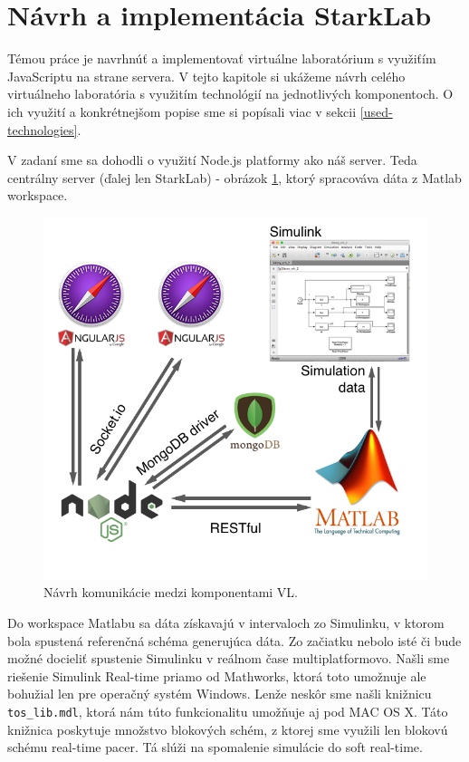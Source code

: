 \section{Návrh a implementácia StarkLab}
\indent Témou práce je navrhnúť a implementovať virtuálne laboratórium s využiťím JavaScriptu na strane servera. V tejto kapitole si ukážeme návrh celého virtuálneho laboratória s využitím technológií na jednotlivých komponentoch. O ich využití a konkrétnejšom popise sme si popísali viac v sekcii \ref{used-technologies}.

V zadaní sme sa dohodli o využití Node.js platformy ako náš server. Teda centrálny server (ďalej len StarkLab) - obrázok \ref{img-software-design}, ktorý spracováva dáta z Matlab workspace. 

\begin{figure}[H]
  \centering
  \includegraphics[scale=0.55]{img/StarkLab.png}
  \caption{Návrh komunikácie medzi komponentami VL.}
  \label{img-software-design}
\end{figure}

Do workspace Matlabu sa dáta získavajú v intervaloch zo Simulinku, v ktorom bola spustená referenčná schéma generujúca dáta. Zo začiatku nebolo isté či bude možné docieliť spustenie Simulinku v reálnom čase multiplatformovo. Našli sme riešenie Simulink Real-time priamo od Mathworks, ktorá toto umožnuje ale bohužial len pre operačný systém Windows. Lenže neskôr sme našli knižnicu \verb|tos_lib.mdl|, ktorá nám túto funkcionalitu umožňuje aj pod MAC OS X. Táto knižnica poskytuje množstvo blokových schém, z ktorej sme využili len blokovú schému real-time pacer. Tá slúži na spomalenie simulácie do soft real-time.

